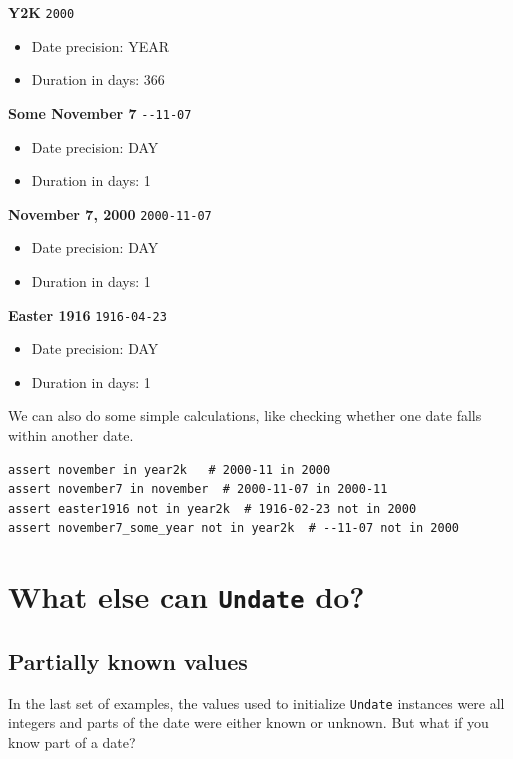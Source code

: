 \documentclass[final]{anthology-ch} %
\begin{document}
\noindent
\textbf{Y2K} \texttt{2000}
\begin{itemize}
    \item Date precision: YEAR
    \item Duration in days: 366
\end{itemize}



\noindent
\textbf{Some November 7} \texttt{-}\texttt{-11-07}
\begin{itemize}
   \item  Date precision: DAY
   \item Duration in days: 1
\end{itemize}



\noindent
\textbf{November 7, 2000} \texttt{2000-11-07}
\begin{itemize}
    \item Date precision: DAY
    \item Duration in days: 1
\end{itemize}



\noindent
\textbf{Easter 1916} \texttt{1916-04-23}
\begin{itemize}
    \item Date precision: DAY
    \item Duration in days: 1
\end{itemize}

We can also do some simple calculations, like checking whether one date falls within another date.
\begin{verbatim}
assert november in year2k   # 2000-11 in 2000
assert november7 in november  # 2000-11-07 in 2000-11
assert easter1916 not in year2k  # 1916-02-23 not in 2000
assert november7_some_year not in year2k  # --11-07 not in 2000
\end{verbatim}

\section{What else can \texttt{Undate} do?}

\subsection{Partially known values}

In the last set of examples, the values used to initialize \texttt{Undate} instances were all integers and parts of the date were either known or unknown. But what if you know part of a date?
\end{document}
